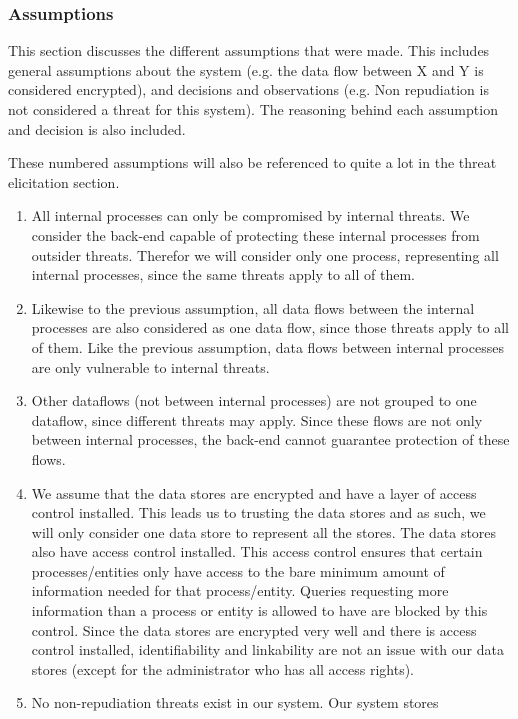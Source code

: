 \subsubsection{Assumptions}
This section discusses the different assumptions that were made. This includes general assumptions about the system (e.g. the data flow between X and Y is considered encrypted), and decisions and observations (e.g. Non repudiation is not considered a threat for this system). The reasoning behind each assumption and decision is also included.

These numbered assumptions will also be referenced to quite a lot in the threat elicitation section.
\begin{enumerate}
	\item \label{it:ass1} All internal processes can only be compromised by internal threats.
			We consider the back-end capable of protecting these internal
			processes from outsider threats. Therefor we will consider only
			one process, representing all internal processes, since the same
			threats apply to all of them.
	\item \label{it:ass2} Likewise to the previous assumption, all data flows between the
			internal processes are also considered as one data flow, since
			those threats apply to all of them. Like the previous assumption,
			data flows between internal processes are only vulnerable to internal
			threats.
	\item \label{it:ass3}Other dataflows (not between internal processes) are not grouped to
			one dataflow, since different threats may apply. Since these flows
			are not only between internal processes, the back-end cannot guarantee
			protection of these flows.
	\item \label{it:ass4}We assume that the data stores are encrypted and have a layer of access control
			installed. This leads us to trusting the data stores and as such, we will only
			consider one data store to represent all the stores. The data stores also have access control
			installed. This access control ensures that certain processes/entities only have access to the
			bare minimum amount of information needed for that process/entity. Queries requesting more
			information than a process or entity is allowed to have are blocked by this control.
			Since the data stores are encrypted
			very well and there is access control installed, identifiability and linkability are not an issue with our data stores
			(except for the administrator who has all access rights).
	\item \label{it:ass5}No non-repudiation threats exist in our system. Our system stores

\end{enumerate}
